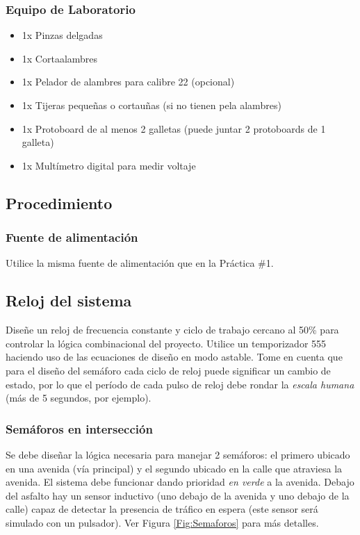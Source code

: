 \subsubsection*{Equipo de Laboratorio}
\begin{itemize}
    \item 1x Pinzas delgadas
    \item 1x Cortaalambres
    \item 1x Pelador de alambres para calibre 22 (opcional)
    \item 1x Tijeras pequeñas o cortauñas (si no tienen pela alambres)
    \item 1x Protoboard de al menos 2 galletas (puede juntar 2 protoboards de 1 galleta)
    \item 1x Multímetro digital para medir voltaje
\end{itemize}

\subsection{Procedimiento}
\subsubsection{Fuente de alimentación}
Utilice la misma fuente de alimentación que en la Práctica \#1.

\subsection{Reloj del sistema}
Diseñe un reloj de frecuencia constante y ciclo de trabajo cercano al 50\% para controlar la lógica combinacional del proyecto. Utilice un temporizador 555 haciendo uso de las 
ecuaciones de diseño en modo astable. Tome en cuenta que para el diseño del semáforo cada ciclo de reloj puede significar un cambio de estado, por lo que el período de cada pulso
de reloj debe rondar la \emph{escala humana} (más de 5 segundos, por ejemplo).

\subsubsection{Semáforos en intersección}
Se debe diseñar la lógica necesaria para manejar 2 semáforos: el primero ubicado en una avenida (vía principal) y el segundo ubicado en la calle que atraviesa la avenida.
El sistema debe funcionar dando prioridad \emph{en verde} a la avenida. Debajo del asfalto hay un sensor inductivo (uno debajo de la avenida y uno debajo de la calle) capaz
de detectar la presencia de tráfico en espera (este sensor será simulado con un pulsador). Ver Figura \ref{Fig:Semaforos} para más detalles.

